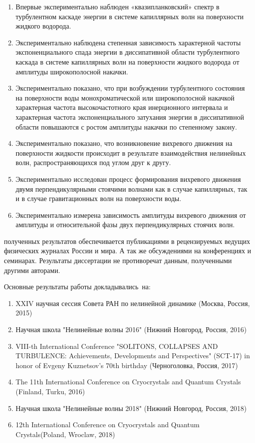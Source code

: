 {}
\begin{enumerate}
	\item Впервые экспериментально наблюден «квазипланковский» спектр в турбулентном каскаде энергии в системе капиллярных волн на поверхности жидкого водорода.
	\item Экспериментально наблюдена степенная зависимость характерной частоты экспоненциального спада энергии в диссипативной области турбулентного каскада в системе капиллярных волн на поверхности жидкого водорода от амплитуды широкополосной накачки.
	\item Экспериментально показано, что при возбуждении турбулентного состояния на поверхности воды монохроматической или широкополосной накачкой характерная частота высокочастотного края инерционного интервала и характерная частота экспоненциального затухания энергии в диссипативной области повышаются с ростом амплитуды накачки по степенному закону.
	\item Экспериментально показано, что возникновение вихревого движения на поверхности жидкости происходит в результате взаимодействия нелинейных волн, распространяющихся под углом друг к другу.
	\item Экспериментально исследован процесс формирования вихревого движения двумя перпендикулярными стоячими волнами как в случае капиллярных, так и в случае гравитационных волн на поверхности воды.
	\item Экспериментально измерена зависимость амплитуды вихревого движения от амплитуды и относительной фазы двух перпендикулярных стоячих волн.

\end{enumerate}


{\reliability} полученных результатов обеспечивается публикациями в рецензируемых ведущих физических журналах России и мира. А так же обсуждениями на конференциях и семинарах. Результаты диссертации не противоречат данным, полученными другими авторами.


{\probation}
Основные результаты работы докладывались~на:
\begin{enumerate}
	\item XXIV научная сессия Совета РАН по нелинейной динамике (Москва, Россия, 2015)
	\item Научная школа "Нелинейные волны 2016" (Нижний Новгород, Россия, 2016)
	\item VIII-th International Conference "SOLITONS, COLLAPSES AND TURBULENCE: Achievements, Developments and Perspectives" (SCT-17) in honor of Evgeny Kuznetsov's 70th birthday (Черноголовка, Россия, 2017)
	\item The 11th International Conference on Cryocrystals and Quantum Crystals (Finland, Turku, 2016)
	\item Научная школа "Нелинейные волны 2018" (Нижний Новгород, Россия, 2018)
	\item 12th International Conference on Cryocrystals and Quantum Crystals(Poland, Wroclaw, 2018)
\end{enumerate}


